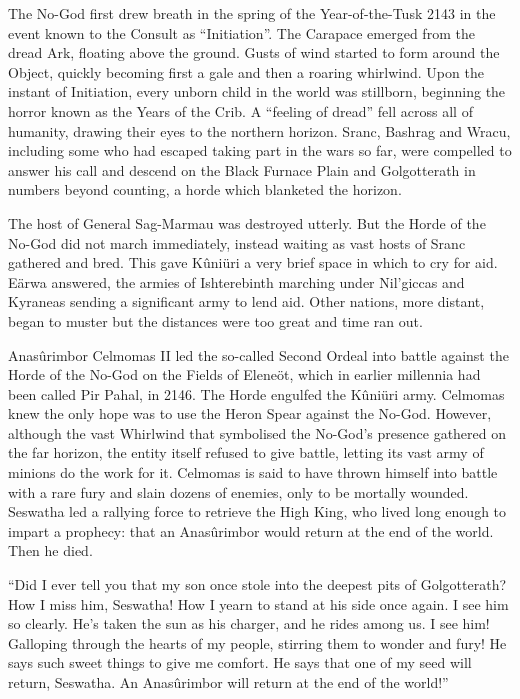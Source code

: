 \documentclass[]{book}
\begin{document}
The No-God first drew breath in the spring of the Year-of-the-Tusk 2143 in the event
known to the Consult as ``Initiation''. The Carapace emerged from the dread Ark,
floating above the ground. Gusts of wind started to form around the Object, quickly
becoming first a gale and then a roaring whirlwind. Upon the instant of Initiation,
every unborn child in the world was stillborn, beginning the horror known as the Years
of the Crib. A ``feeling of dread'' fell across all of humanity, drawing their eyes to the
northern horizon. Sranc, Bashrag and Wracu, including some who had escaped taking
part in the wars so far, were compelled to answer his call and descend on the Black
Furnace Plain and Golgotterath in numbers beyond counting, a horde which blanketed
the horizon.

The host of General Sag-Marmau was destroyed utterly. But the Horde of the No-God
did not march immediately, instead waiting as vast hosts of Sranc gathered and bred.
This gave Kûniüri a very brief space in which to cry for aid. Eärwa answered, the armies
of Ishterebinth marching under Nil'giccas and Kyraneas sending a significant army to
lend aid. Other nations, more distant, began to muster but the distances were too great
and time ran out.

Anasûrimbor Celmomas II led the so-called Second Ordeal into battle against the
Horde of the No-God on the Fields of Eleneöt, which in earlier millennia had been
called Pir Pahal, in 2146. The Horde engulfed the Kûniüri army. Celmomas knew the
only hope was to use the Heron Spear against the No-God. However, although the vast
Whirlwind that symbolised the No-God's presence gathered on the far horizon, the
entity itself refused to give battle, letting its vast army of minions do the work for it.
Celmomas is said to have thrown himself into battle with a rare fury and slain dozens
of enemies, only to be mortally wounded. Seswatha led a rallying force to retrieve the
High King, who lived long enough to impart a prophecy: that an Anasûrimbor would
return at the end of the world. Then he died.

``Did I ever tell you that my son once stole into the deepest pits of Golgotterath? How I
miss him, Seswatha! How I yearn to stand at his side once again. I see him so clearly.
He's taken the sun as his charger, and he rides among us. I see him! Galloping through
the hearts of my people, stirring them to wonder and fury! He says such sweet things to
give me comfort. He says that one of my seed will return, Seswatha. An Anasûrimbor
will return at the end of the world!''
\end{document}
